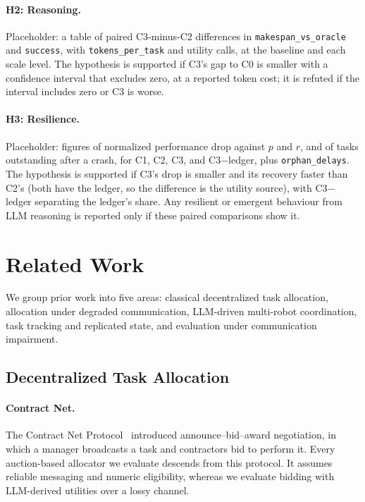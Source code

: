 \documentclass[letterpaper]{article}
\begin{document}
\paragraph{H2: Reasoning.}
Placeholder: a table of paired C3-minus-C2 differences in \texttt{makespan\_vs\_oracle} and \texttt{success}, with \texttt{tokens\_per\_task} and utility calls, at the baseline and each scale level. The hypothesis is supported if C3's gap to C0 is smaller with a confidence interval that excludes zero, at a reported token cost; it is refuted if the interval includes zero or C3 is worse.

\paragraph{H3: Resilience.}
Placeholder: figures of normalized performance drop against $p$ and $r$, and of tasks outstanding after a crash, for C1, C2, C3, and C3$-$ledger, plus \texttt{orphan\_delays}. The hypothesis is supported if C3's drop is smaller and its recovery faster than C2's (both have the ledger, so the difference is the utility source), with C3$-$ledger separating the ledger's share. Any resilient or emergent behaviour from LLM reasoning is reported only if these paired comparisons show it.

\section{Related Work}
\label{sec:related}

We group prior work into five areas: classical decentralized task allocation, allocation under degraded communication, LLM-driven multi-robot coordination, task tracking and replicated state, and evaluation under communication impairment.

\subsection{Decentralized Task Allocation}

\paragraph{Contract Net.}
The Contract Net Protocol~\citep{smith1980contract} introduced announce--bid--award negotiation, in which a manager broadcasts a task and contractors bid to perform it. Every auction-based allocator we evaluate descends from this protocol. It assumes reliable messaging and numeric eligibility, whereas we evaluate bidding with LLM-derived utilities over a lossy channel.
\end{document}

